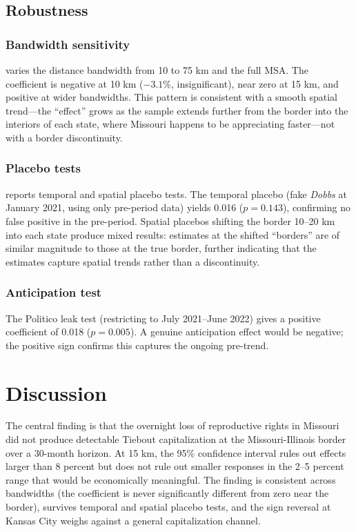 \documentclass[12pt]{article}
\begin{document}
\subsection{Robustness}



\subsubsection*{Bandwidth sensitivity}  varies the distance bandwidth from 10 to 75 km and the full MSA. The coefficient is negative at 10 km ($-3.1$\%, insignificant), near zero at 15 km, and positive at wider bandwidths. This pattern is consistent with a smooth spatial trend---the ``effect'' grows as the sample extends further from the border into the interiors of each state, where Missouri happens to be appreciating faster---not with a border discontinuity.

\subsubsection*{Placebo tests}  reports temporal and spatial placebo tests. The temporal placebo (fake \textit{Dobbs} at January 2021, using only pre-period data) yields 0.016 ($p = 0.143$), confirming no false positive in the pre-period. Spatial placebos shifting the border 10--20 km into each state produce mixed results: estimates at the shifted ``borders'' are of similar magnitude to those at the true border, further indicating that the estimates capture spatial trends rather than a discontinuity.

\subsubsection*{Anticipation test} The Politico leak test (restricting to July 2021--June 2022) gives a positive coefficient of 0.018 ($p = 0.005$). A genuine anticipation effect would be negative; the positive sign confirms this captures the ongoing pre-trend.



\section{Discussion}
\label{sec:discussion}

The central finding is that the overnight loss of reproductive rights in Missouri did not produce detectable Tiebout capitalization at the Missouri-Illinois border over a 30-month horizon. At 15 km, the 95\% confidence interval rules out effects larger than 8 percent but does not rule out smaller responses in the 2--5 percent range that would be economically meaningful. The finding is consistent across bandwidths (the coefficient is never significantly different from zero near the border), survives temporal and spatial placebo tests, and the sign reversal at Kansas City weighs against a general capitalization channel.
\end{document}
